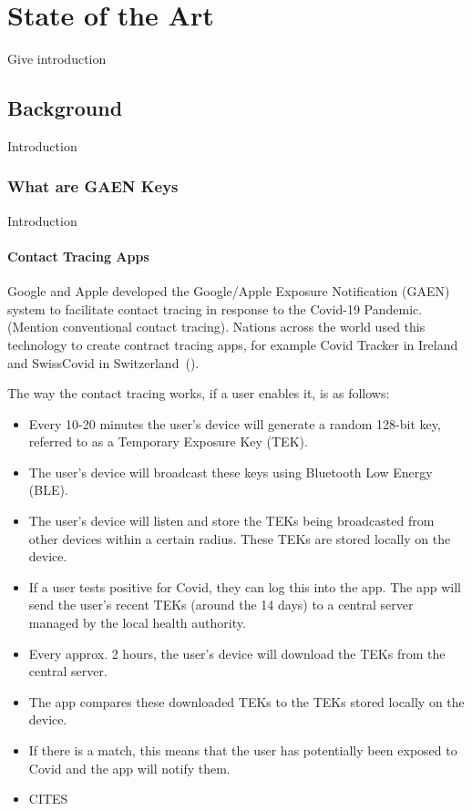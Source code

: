 \chapter{State of the Art}

Give introduction

\section{Background}
Introduction

\subsection{What are GAEN Keys}
Introduction
\subsubsection{Contact Tracing Apps}
Google and Apple developed the Google/Apple Exposure Notification (GAEN) system to facilitate contact tracing in response to the Covid-19 Pandemic. (Mention conventional contact tracing). Nations across the world used this technology to create contract tracing apps, for example Covid Tracker in Ireland and SwissCovid in Switzerland~(\cite{9488728}).  \newline

The way the contact tracing works, if a user enables it, is as follows:
\begin{itemize}
    \item Every 10-20 minutes the user's device will generate a random 128-bit key, referred to as a Temporary Exposure Key (TEK). 
    \item The user's device will broadcast these keys using Bluetooth Low Energy (BLE). 
    \item The user's device will listen and store the TEKs being broadcasted from other devices within a certain radius. These TEKs are stored locally on the device.
    \item If a user tests positive for Covid, they can log this into the app. The app will send the user's recent TEKs (around the 14 days) to a central server managed by the local health authority.
    \item Every approx. 2 hours, the user's device will download the TEKs from the central server.
    \item The app compares these downloaded TEKs to the TEKs stored locally on the device.
    \item If there is a match, this means that the user has potentially been exposed to Covid and the app will notify them. 
    \item CITES
\end{itemize}

